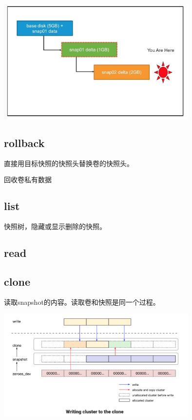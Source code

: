 \begin{center}
\includegraphics[width=10cm]{../imgs/snap-delete-non-leaf.png}
\end{center}


\subsection{rollback}

直接用目标快照的快照头替换卷的快照头。

回收卷私有数据

\subsection{list}

快照树，隐藏或显示删除的快照。

\subsection{read}

\subsection{clone}

读取snapshot的内容。读取卷和快照是同一个过程。

\begin{center}
\includegraphics[width=10cm]{../imgs/clone-write.png}
\end{center}

